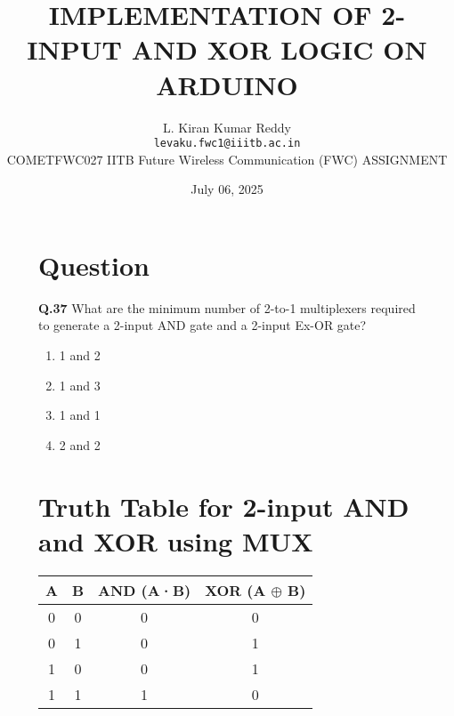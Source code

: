\documentclass[12pt,a4paper]{article}
\title{\textbf{IMPLEMENTATION OF 2-INPUT AND XOR LOGIC ON ARDUINO}}
\author{L. Kiran Kumar Reddy \\ \texttt{levaku.fwc1@iiitb.ac.in} \\
 \hspace{-0.3cm}COMETFWC027\hspace{0.5cm} IITB Future Wireless Communication (FWC)\hspace{0.4cm} ASSIGNMENT}
\date{July 06, 2025}
\begin{document}
\maketitle


\begin{figure}[H]
  \centering
  \begin{minipage}[t]{0.48\textwidth}
    \section*{Question}
    \small
    \noindent\textbf{Q.37} \quad What are the minimum number of 2-to-1 multiplexers required to generate a 2-input AND gate and a 2-input Ex-OR gate?
    \begin{enumerate}[label=(\Alph*)]
        \item 1 and 2
        \item 1 and 3
        \item 1 and 1
        \item 2 and 2
    \end{enumerate}

    \vspace{0.3cm}
    \section*{Truth Table for 2-input AND and XOR using MUX}
    \renewcommand{\arraystretch}{1.4}
    \begin{tabular}{|c|c|c|c|}
    \hline
    \textbf{A} & \textbf{B} & \textbf{AND (A·B)} & \textbf{XOR (A $\oplus$ B)} \\
    \hline
    0 & 0 & 0 & 0 \\
    0 & 1 & 0 & 1 \\
    1 & 0 & 0 & 1 \\
    1 & 1 & 1 & 0 \\
    \hline
    \end{tabular}
  \end{minipage}\hfill
  \begin{minipage}[t]{0.48\textwidth}

\end{minipage}
\end{figure}
\end{document}
